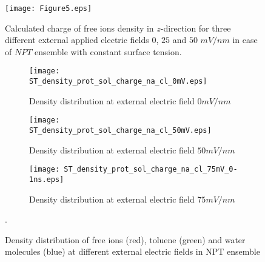 \begin{figure}[ht]
\begin{center}
\texttt{[image: Figure5.eps]}
\end{center}
\caption{Calculated charge of free ions density in $z$-direction for three different external applied electric fields $0$, $25$ and $50$ $mV/nm$ in case of $NPT$ ensemble with constant surface tension.}
\label{fig:npt_charges_all_voltage}
\end{figure}

 
\begin{figure}[h]
\centering
\begin{subfigure}{.32\textwidth}
  \centering
  \texttt{[image: ST\_density\_prot\_sol\_charge\_na\_cl\_0mV.eps]}
  \caption{Density distribution at external electric field $0 mV/nm$}
  \label{fig:npt_dens_dist_0mV}
\end{subfigure}%
\begin{subfigure}{.32\textwidth}
  \centering
  \texttt{[image: ST\_density\_prot\_sol\_charge\_na\_cl\_50mV.eps]}
  \caption{Density distribution at external electric field $50 mV/nm$}
  \label{fig:npt_dens_dist_50mV}
\end{subfigure}
\begin{subfigure}{.32\textwidth}%
  \centering
  \texttt{[image: ST\_density\_prot\_sol\_charge\_na\_cl\_75mV\_0-1ns.eps]}
  \caption{Density distribution at external electric field $75 mV/nm$}
  \label{fig:npt_dens_dist_75mV}
\end{subfigure}
\caption{Density distribution of free ions (red), toluene (green) and water molecules (blue) at different external electric fields in NPT ensemble}.
\label{fig:npt_all_distributions}
\end{figure}
